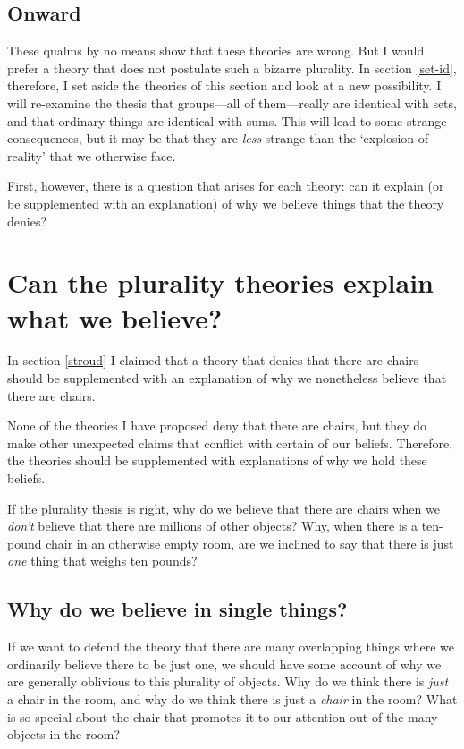 \documentclass[11pt]{article}
\begin{document}
\begin{spacing}{1.5}
\subsection{Onward}
\label{hovda-o}
These qualms by no means show that these theories are wrong.  But I
would prefer a theory that does not postulate such a bizarre
plurality.  In section \ref{set-id}, therefore, I set aside the
theories of this section and look at a new possibility.  I will
re-examine the thesis that groups---all of them---really are identical
with sets, and that ordinary things are identical with sums.  This
will lead to some strange consequences, but it may be that they are
{\em less} strange than the `explosion of reality' that we otherwise
face.

First, however, there is a question that arises for each theory: can
it explain (or be supplemented with an explanation) of why we believe
things that the theory denies?

\section{Can the plurality theories explain what we believe?}
\label{explain-p}
In section \ref{stroud} I claimed that a theory that denies that there
are chairs should be supplemented with an explanation of why we
nonetheless believe that there are chairs.

None of the theories I have proposed deny that there are chairs, but
they do make other unexpected claims that conflict with certain of our
beliefs.  Therefore, the theories should be supplemented with
explanations of why we hold these beliefs.

If the plurality thesis is right, why do we believe that there are
chairs when we {\em don't} believe that there are millions of other
objects?  Why, when there is a ten-pound chair in an otherwise empty
room, are we inclined to say that there is just {\em one} thing that
weighs ten pounds?

\subsection{Why do we believe in single things?}
\label{exp-single}
If we want to defend the theory that there are many overlapping things
where we ordinarily believe there to be just one, we should have some
account of why we are generally oblivious to this plurality of
objects.  Why do we think there is {\em just} a chair in the room, and
why do we think there is just a {\em chair} in the room?  What is so
special about the chair that promotes it to our attention out of the
many objects in the room?


\end{spacing}
\end{document}
